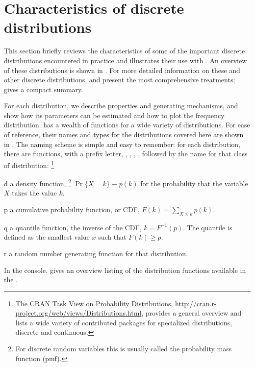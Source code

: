 \documentclass[10pt,krantz2]{krantz}\usepackage[]{graphicx}\usepackage[]{color}
\begin{document}
\section{Characteristics of  discrete distributions}\label{sec:discrete-distrib}
This section briefly reviews the characteristics of some of the
important discrete distributions encountered in practice and illustrates their
use with \R.
An overview of these distributions is shown in .
For more detailed information on these and other discrete distributions,
\citet{Johnson-etal:92} and \citet{WimmerAltman:1999:thesaurus}
present the most comprehensive treatments;
\citet[]{Zelterman:99} gives a compact summary.



For each distribution, we describe properties and generating
mechanisms, and show how its parameters can be estimated
and how to plot the frequency distribution.  \R has a wealth of
functions for a wide variety of distributions.  For ease of reference,
their names and types for the distributions covered here are shown
in . The naming scheme is simple and easy to
remember:  for each distribution, there are functions, with a prefix
letter, , , , , followed by the
name for that class of distribution:%
\footnote{The CRAN Task View on Probability Distributions,
\url{http://cran.r-project.org/web/views/Distributions.html},
provides a general overview and lists a wide variety of contributed
packages for specialized distributions, discrete and continuous.}
\begin{description*}
  \item[d] a density function,%
\footnote{
For discrete random variables this is usually called the probability mass function (pmf).
}
  $\Pr \{X = k\} \equiv p(k)$
for the probability that the variable $X$ takes the value $k$.
  \item[p] a cumulative probability function, or CDF,
  $F(k) = \sum_{X\le k} p(k)$.
  \item[q] a quantile function, the inverse of the CDF, $k = F^{-1} (p)$.
  The quantile  is defined as the smallest value $x$ such that $F(k) \ge p$.
  \item[r] a random number generating function for that distribution.
\end{description*}
In the \R console,  gives an overview listing of
the distribution functions available in the .
\end{document}

